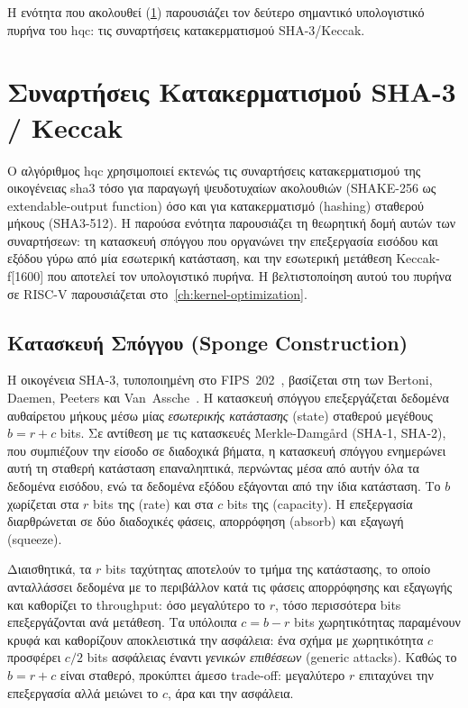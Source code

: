 Η ενότητα που ακολουθεί (\cref{sec:keccak-theory}) παρουσιάζει τον δεύτερο
σημαντικό υπολογιστικό πυρήνα του \gls{hqc}: τις συναρτήσεις κατακερματισμού
SHA-3/Keccak.


\section{Συναρτήσεις Κατακερματισμού SHA-3 / Keccak}
\label{sec:keccak-theory}

Ο αλγόριθμος \gls{hqc} χρησιμοποιεί εκτενώς τις συναρτήσεις κατακερματισμού της
οικογένειας \gls{sha3} τόσο για παραγωγή ψευδοτυχαίων ακολουθιών (SHAKE-256
ως extendable-output function) όσο και για κατακερματισμό (hashing) σταθερού μήκους
(SHA3-512).
Η παρούσα ενότητα παρουσιάζει τη θεωρητική δομή αυτών των συναρτήσεων: τη
κατασκευή σπόγγου που οργανώνει την επεξεργασία εισόδου και εξόδου γύρω από μία εσωτερική κατάσταση, και την
εσωτερική μετάθεση Keccak-f[1600] που αποτελεί τον υπολογιστικό πυρήνα.
Η βελτιστοποίηση αυτού του πυρήνα σε RISC-V παρουσιάζεται στο~\cref{ch:kernel-optimization}.


\subsection{Κατασκευή Σπόγγου (Sponge Construction)}
\label{sec:sponge-construction}

Η οικογένεια SHA-3, τυποποιημένη στο FIPS~202~\cite{FIPS202}, βασίζεται στη
 των Bertoni, Daemen, Peeters
και Van~Assche~\cite{Bertoni2011-sponge}.
Η κατασκευή σπόγγου επεξεργάζεται δεδομένα αυθαίρετου μήκους μέσω μίας
\emph{εσωτερικής κατάστασης} (state) σταθερού μεγέθους $b = r + c$ bits. Σε
αντίθεση με τις κατασκευές Merkle-Damgård (SHA-1, SHA-2), που συμπιέζουν την
είσοδο σε διαδοχικά βήματα, η κατασκευή σπόγγου ενημερώνει αυτή τη σταθερή
κατάσταση επαναληπτικά, περνώντας μέσα από αυτήν όλα τα δεδομένα εισόδου, ενώ τα
δεδομένα εξόδου εξάγονται από την ίδια κατάσταση. Το $b$ χωρίζεται στα $r$ bits της  (rate) και στα $c$
bits της  (capacity). Η επεξεργασία διαρθρώνεται σε δύο
διαδοχικές φάσεις, απορρόφηση (absorb) και εξαγωγή (squeeze).

Διαισθητικά, τα $r$ bits ταχύτητας αποτελούν το  τμήμα της κατάστασης, το
οποίο ανταλλάσσει δεδομένα με το περιβάλλον κατά τις φάσεις απορρόφησης και εξαγωγής
και καθορίζει το throughput: όσο μεγαλύτερο το $r$, τόσο περισσότερα bits
επεξεργάζονται ανά μετάθεση. Τα υπόλοιπα $c = b - r$ bits χωρητικότητας παραμένουν
κρυφά και καθορίζουν αποκλειστικά την ασφάλεια: ένα σχήμα με
χωρητικότητα $c$ προσφέρει $c/2$ bits ασφάλειας έναντι \emph{γενικών επιθέσεων}
(generic attacks).
Καθώς το $b = r + c$ είναι σταθερό, προκύπτει άμεσο trade-off: μεγαλύτερο $r$
επιταχύνει την επεξεργασία αλλά μειώνει το $c$, άρα και την ασφάλεια.

